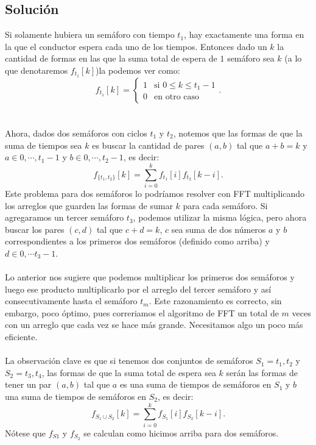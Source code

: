 \subsection*{Solución}
Si solamente hubiera un semáforo con tiempo $t_1$, hay exactamente una forma en la que el conductor espera cada uno de los tiempos. Entonces dado un $k$ la cantidad de formas en las que la suma total de espera de $1$ semáforo sea $k$ (a lo que denotaremos $f_{t_1}[k]$)la podemos ver como:
\[
f_{t_1}[k] = \begin{cases} 1 & \text{si } 0 \leq k \leq t_1 - 1 \\ 0 & \text{en otro caso} \end{cases}.
\]
\\\\
Ahora, dados dos semáforos con ciclos $t_1$ y $t_2$, notemos que las formas de que la suma de tiempos sea $k$ es buscar la cantidad de pares $(a,b)$ tal que $a+b=k$ y $a\in {0,\cdots,t_1-1}$ y $b\in{0,\cdots,t_2-1}$, es decir:
\[
    f_{\{t_1,t_2\}}[k]=\sum_{i=0}^{k}f_{t_1}[i]f_{t_2}[k-i].
\]
Este problema para dos semáforos lo podríamos resolver con FFT multiplicando los arreglos que guarden las formas de sumar $k$ para cada semáforo. Si agregaramos un tercer semáforo $t_3$, podemos utilizar la misma lógica, pero ahora buscar los pares $(c,d)$ tal que $c+d=k$, $c$ sea suma de dos números $a$ y $b$ correspondientes a los primeros dos semáforos (definido como arriba) y $d\in {0,\cdots t_3-1}$.
\\\\Lo anterior nos sugiere que podemos multiplicar los primeros dos semáforos y luego ese producto multiplicarlo por el arreglo del tercer semáforo y así consecutivamente hasta el semáforo $t_m$. Este razonamiento es correcto, sin embargo, poco óptimo, pues correriamos el algoritmo de FFT un total de $m$ veces con un arreglo que cada vez se hace más grande. Necesitamos algo un poco más eficiente.
\\\\
La observación clave es que si tenemos dos conjuntos de semáforos $S_1={t_1,t_2}$ y $S_2={t_3,t_4}$, las formas de que la suma total de espera sea $k$ serán las formas de tener un par $(a,b)$ tal que $a$ es una suma de tiempos de semáforos en $S_1$ y $b$ una suma de tiempos de semáforos en $S_2$, es decir:
\[
    f_{S_1\cup S_2}[k]=\sum_{i=0}^{k}f_{S_1}[i]f_{S_2}[k-i].
\]
Nótese que $f_{S1}$ y $f_{S_2}$ se calculan como hicimos arriba para dos semáforos.
\\\\
